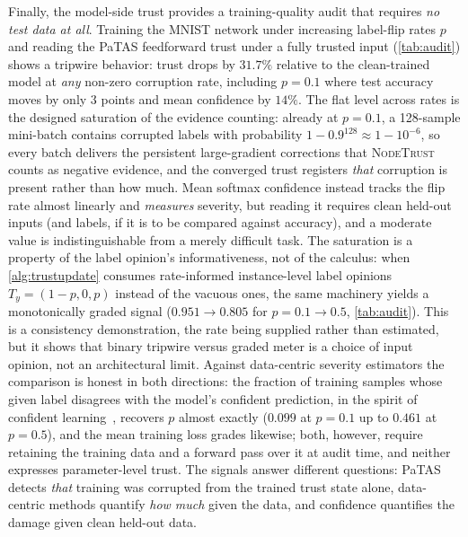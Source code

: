 Finally, the model-side trust provides a training-quality audit that requires \emph{no test data at all}. Training the MNIST network under increasing label-flip rates $p$ and reading the PaTAS feedforward trust under a fully trusted input (\cref{tab:audit}) shows a tripwire behavior: trust drops by $31.7\%$ relative to the clean-trained model at \emph{any} non-zero corruption rate, including $p{=}0.1$ where test accuracy moves by only $3$ points and mean confidence by $14\%$. The flat level across rates is the designed saturation of the evidence counting: already at $p{=}0.1$, a 128-sample mini-batch contains corrupted labels with probability $1-0.9^{128} \approx 1-10^{-6}$, so every batch delivers the persistent large-gradient corrections that \textsc{NodeTrust} counts as negative evidence, and the converged trust registers \emph{that} corruption is present rather than how much. Mean softmax confidence instead tracks the flip rate almost linearly and \emph{measures} severity, but reading it requires clean held-out inputs (and labels, if it is to be compared against accuracy), and a moderate value is indistinguishable from a merely difficult task. The saturation is a property of the label opinion's informativeness, not of the calculus: when \cref{alg:trustupdate} consumes rate-informed instance-level label opinions $T_y = (1{-}p, 0, p)$ instead of the vacuous ones, the same machinery yields a monotonically graded signal ($0.951 \to 0.805$ for $p = 0.1 \to 0.5$, \cref{tab:audit}). This is a consistency demonstration, the rate being supplied rather than estimated, but it shows that binary tripwire versus graded meter is a choice of input opinion, not an architectural limit. Against data-centric severity estimators the comparison is honest in both directions: the fraction of training samples whose given label disagrees with the model's confident prediction, in the spirit of confident learning~\cite{northcutt2021confidentlearning}, recovers $p$ almost exactly ($0.099$ at $p{=}0.1$ up to $0.461$ at $p{=}0.5$), and the mean training loss grades likewise; both, however, require retaining the training data and a forward pass over it at audit time, and neither expresses parameter-level trust. The signals answer different questions: PaTAS detects \emph{that} training was corrupted from the trained trust state alone, data-centric methods quantify \emph{how much} given the data, and confidence quantifies the damage given clean held-out data.

